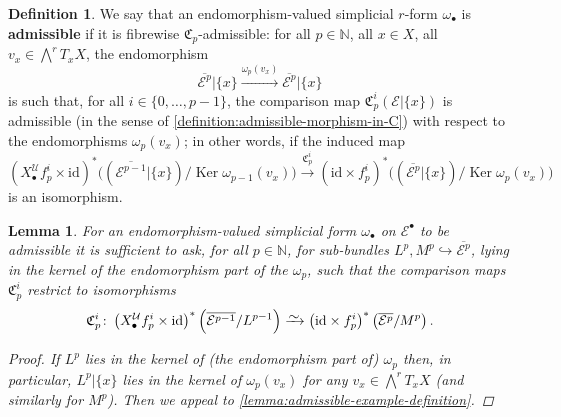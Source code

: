 \documentclass[11pt,fleqn]{article}
\theoremstyle{plain}
\newtheorem{lemma}[theorem]{Lemma}
\theoremstyle{definition}
\newtheorem{definition}[theorem]{Definition}
\theoremstyle{remark}
\numberwithin{equation}{theorem}
\newcommand{\cover}{\mathcal{U}}
\newcommand{\restricted}{\mathbin{\big\vert}}
\newcommand{\id}{\mathrm{id}}
\newcommand{\congto}{\xrightarrow{\raisebox{-.5ex}[0ex][0ex]{$\sim$}}}
\newcommand{\define}[1]{\textbf{#1}}
\newcommand{\nerve}[1]{X_{#1}^\cover}
\newcommand{\comparison}[1]{\mathfrak{C}_{#1}}
\DeclareMathOperator{\Ker}{Ker}
\begin{document}
        \begin{definition}
            We say that an endomorphism-valued simplicial $r$-form $\omega_\bullet$ is \define{admissible} if it is fibrewise $\comparison{p}$-admissible: for all $p\in\mathbb{N}$, all $x\in X$, all $v_x\in\bigwedge^r T_x X$, the endomorphism
            \[
                \overline{\mathcal{E}^p} \restricted \{x\}
                \xrightarrow{\omega_p(v_x)}
                \overline{\mathcal{E}^p} \restricted \{x\}
            \]
            is such that, for all $i\in\{0,\ldots,p-1\}$, the comparison map $\comparison{p}^i(\mathcal{E}\restricted\{x\})$ is admissible (in the sense of \cref{definition:admissible-morphism-in-C}) with respect to the endomorphisms $\omega_p(v_x)$; in other words, if the induced map
            \[
                \left(\nerve{\bullet} f_p^i\times\id\right)^*
                \bigg(
                    \left(\overline{\mathcal{E}^{p-1}}\restricted \{x\}\right)/\Ker\omega_{p-1}(v_x)
                \bigg)
                \xrightarrow{\comparison{p}^i}
                \left(\id\times f_p^i\right)^*
                \bigg(
                    \left(\overline{\mathcal{E}^p}\restricted \{x\}\right)/\Ker\omega_p(v_x)
                \bigg)
            \]
            is an isomorphism.
        \end{definition}

        \begin{lemma}\label{lemma:admissible-endomorphism-valued-form-criterion}
            For an endomorphism-valued simplicial form $\omega_\bullet$ on $\mathcal{E}^\bullet$ to be admissible it is sufficient to ask, for all $p\in\mathbb{N}$, for sub-bundles $L^p,M^p\hookrightarrow\overline{\mathcal{E}^p}$, lying in the kernel of the endomorphism part of the $\omega_p$, such that the comparison maps $\comparison{p}^i$ restrict to isomorphisms
            \[
                \comparison{p}^i\colon
                \left(\nerve{\bullet} f^i_p\times\id\right)^*\left(\overline{\mathcal{E}^{p-1}}/L^{p-1}\right)
                \congto
                \left(\id\times f_p^i\right)^*\left(\overline{\mathcal{E}^p}/M^p\right).
            \]
            \begin{proof}
                If $L^p$ lies in the kernel of (the endomorphism part of) $\omega_p$ then, in particular, $L^p\restricted \{x\}$ lies in the kernel of $\omega_p(v_x)$ for any $v_x\in\bigwedge^r T_x X$ (and similarly for $M^p$).
                Then we appeal to \cref{lemma:admissible-example-definition}.
            \end{proof}
        \end{lemma}
\end{document}
